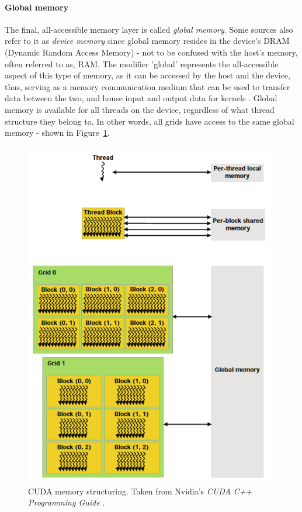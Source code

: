 \paragraph{Global memory}\label{Paragraph:theory-CUDA-memory-management-global-memory}
The final, all-accessible memory layer is called \textit{global memory}. Some sources also refer to it as \textit{device memory} since global memory resides in the device's DRAM (Dynamic Random Access Memory) - not to be confused with the host's memory, often referred to as, RAM. The modifier 'global' represents the all-accessible aspect of this type of memory, as it can be accessed by the host and the device, thus, serving as a memory communication medium that can be used to transfer data between the two, and house input and output data for kernels \cite{Harris7January2013}. Global memory is available for all threads on the device, regardless of what thread structure they belong to. In other words, all grids have access to the same global memory - shown in Figure~\ref{Figure:theory-CUDA-memory-management}.

\begin{figure}[ht!]
	\centering
	\includegraphics[width=11cm, keepaspectratio]{images/ch1/CUDA_memory_management.png}
	\caption{CUDA memory structuring. Taken from Nvidia's \emph{CUDA C++ Programming Guide} \cite{NVIDIAMay2022}.}
	\label{Figure:theory-CUDA-memory-management}
\end{figure}

